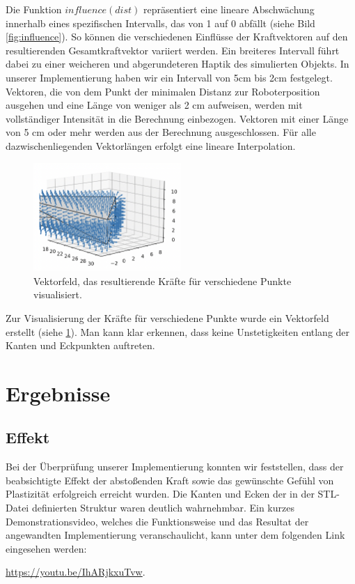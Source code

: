 \documentclass[conference]{IEEEtran}
\begin{document}
Die Funktion $influence(dist)$ repräsentiert eine lineare Abschwächung innerhalb eines spezifischen Intervalls, das von 1 auf 0 abfällt (siehe Bild \ref{fig:influence}). So können die verschiedenen Einflüsse der Kraftvektoren auf den resultierenden Gesamtkraftvektor variiert werden. Ein breiteres Intervall führt dabei zu einer weicheren und abgerundeteren Haptik des simulierten Objekts. In unserer Implementierung haben wir ein Intervall von 5cm bis 2cm festgelegt. Vektoren, die von dem Punkt der minimalen Distanz zur Roboterposition ausgehen und eine Länge von weniger als 2 cm aufweisen, werden mit vollständiger Intensität in die Berechnung einbezogen. Vektoren mit einer Länge von 5 cm oder mehr werden aus der Berechnung ausgeschlossen. Für alle dazwischenliegenden Vektorlängen erfolgt eine lineare Interpolation.

\begin{figure}[h]
    \centering
    \includegraphics[width=0.5\textwidth]{pics/vectorfield.png}
    \caption{Vektorfeld, das resultierende Kräfte für verschiedene Punkte visualisiert.}
    \label{fig:vectorfield}
\end{figure}

Zur Visualisierung der Kräfte für verschiedene Punkte wurde ein Vektorfeld erstellt 
(siehe \ref{fig:vectorfield}). Man kann klar erkennen, dass keine Unstetigkeiten entlang der 
Kanten und Eckpunkten auftreten.


\section{Ergebnisse}

\subsection{Effekt}
Bei der Überprüfung unserer Implementierung konnten wir feststellen, dass der beabsichtigte Effekt der 
abstoßenden Kraft sowie das gewünschte Gefühl von Plastizität erfolgreich erreicht wurden. 
Die Kanten und Ecken der in der STL-Datei definierten Struktur waren deutlich wahrnehmbar. 
Ein kurzes Demonstrationsvideo, welches die Funktionsweise und das Resultat der angewandten 
Implementierung veranschaulicht, kann unter dem folgenden Link eingesehen werden:
\begin{minipage}{\textwidth}
    \nobreak\url{https://youtu.be/IhARjkxuTvw}.
\end{minipage}
\end{document}
